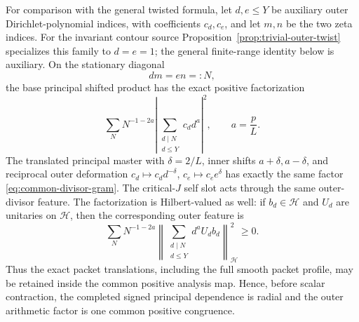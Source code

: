 \begin{proposition}
\label{prop:common-divisor-feature}
For comparison with the general twisted formula, let $d,e\le Y$ be auxiliary
outer Dirichlet-polynomial indices, with coefficients
$c_d,c_e$, and let $m,n$ be the two zeta indices. For the invariant contour
source Proposition~\ref{prop:trivial-outer-twist} specializes this family to
$d=e=1$; the general finite-range identity below is auxiliary. On the stationary diagonal
\begin{equation}
\boxed{dm=en=:N,}
\label{eq:common-product-N}
\end{equation}
the base principal shifted product has the exact positive factorization
\begin{equation}
\boxed{
\sum_NN^{-1-2a}
\left|\sum_{\substack{d\mid N\\d\le Y}}c_dd^a\right|^2,
\qquad a=\frac pL.
}
\label{eq:common-divisor-gram}
\end{equation}
The translated principal master with $\delta=2/L$, inner shifts
$a+\delta,a-\delta$, and reciprocal outer deformation
$c_d\mapsto c_dd^{-\delta}$, $c_e\mapsto c_ee^{\delta}$ has exactly the same
factor \eqref{eq:common-divisor-gram}. The critical-$J$ self slot acts through
the same outer-divisor feature. The factorization is Hilbert-valued as well: if
$b_d\in\mathcal H$ and $U_d$ are unitaries on $\mathcal H$, then the corresponding
outer feature is
\begin{equation}
\boxed{
\sum_NN^{-1-2a}
\left\|\sum_{\substack{d\mid N\\d\le Y}}d^aU_db_d\right\|_{\mathcal H}^2
\ge0.
}
\label{eq:common-divisor-Hilbert-gram}
\end{equation}
Thus the exact packet translations, including the full smooth packet profile,
may be retained inside the common positive analysis map. Hence, before scalar
contraction, the completed signed principal dependence is radial and the outer
arithmetic factor is one common positive congruence.


\end{proposition}
